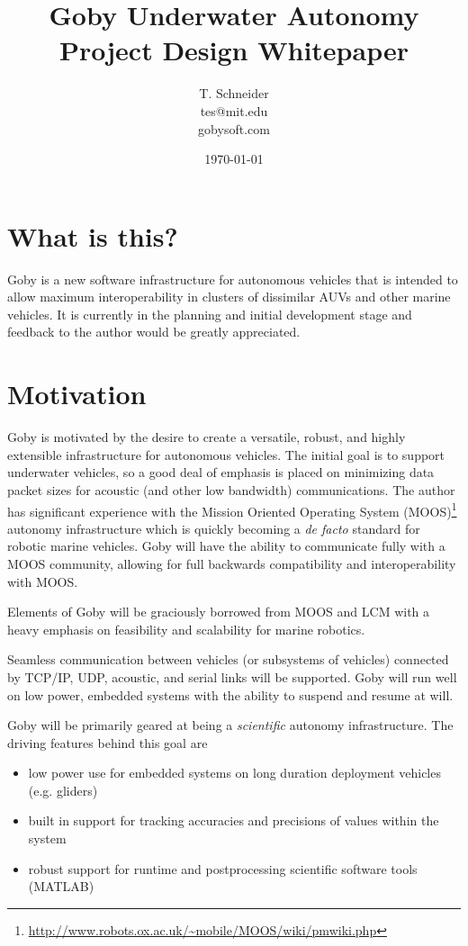 \documentclass[10pt,letterpaper]{article}
\author{T. Schneider \\ tes@mit.edu \\ gobysoft.com}
\title{Goby Underwater Autonomy Project Design Whitepaper}
\date{\today}
\begin{document}
\maketitle 


\section{What is this?}
Goby is a new software infrastructure for autonomous vehicles that is intended to allow maximum interoperability in clusters of dissimilar AUVs and other marine vehicles. It is currently in the planning and initial development stage and feedback to the author would be greatly appreciated.

\section{Motivation}

Goby is motivated by the desire to create a versatile, robust, and highly extensible infrastructure for autonomous vehicles. The initial goal is to support underwater vehicles, so a good deal of emphasis is placed on minimizing data packet sizes for acoustic (and other low bandwidth) communications. The author has significant experience with the Mission Oriented Operating System (MOOS)\footnote{\url{http://www.robots.ox.ac.uk/~mobile/MOOS/wiki/pmwiki.php}} autonomy infrastructure which is quickly becoming a \textit{de facto} standard for robotic marine vehicles. Goby will have the ability to communicate fully with a MOOS community, allowing for full backwards compatibility and interoperability with MOOS.

Elements of Goby will be graciously borrowed from MOOS and LCM with a heavy emphasis on feasibility and scalability for marine robotics.

Seamless communication between vehicles (or subsystems of vehicles) connected by TCP/IP, UDP, acoustic, and serial links will be supported. Goby will run well on low power, embedded systems with the ability to suspend and resume at will.

Goby will be primarily geared at being a \textit{scientific} autonomy infrastructure. The driving features behind this goal are

\begin{itemize}
\item low power use for embedded systems on long duration deployment vehicles (e.g. gliders)
\item built in support for tracking accuracies and precisions of values within the system
\item robust support for runtime and postprocessing scientific software tools (MATLAB)
\end{itemize}
\end{document}
